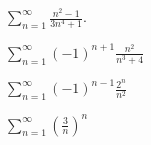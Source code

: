 \documentclass[12pt]{amsart}
\begin{document}
\begin{thm}
  $\displaystyle{\sum_{n=1}^\infty \frac{n^2 - 1}{3n^4 + 1}}.$
\end{thm}

\newpage

\begin{thm}
  $\displaystyle{\sum_{n=1}^\infty (-1)^{n+1}\frac{n^2}{n^3 + 4}}$
\end{thm}

\newpage

\begin{thm}
  $\displaystyle{\sum_{n=1}^\infty (-1)^{n-1}\frac{2^n}{n^2}}$
\end{thm}

\newpage

\begin{thm}
  $\displaystyle{\sum_{n=1}^\infty \left(\frac{3}{n}\right)^n}$
\end{thm}
\end{document}

